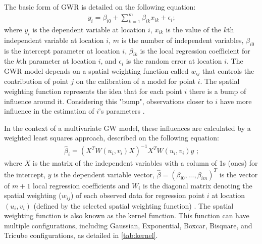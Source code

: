The basic form of GWR is detailed on the following equation:\begin{align}
    y_i = \beta_{i0} + \sum_{k=1}^{m} \beta_{ik} x_{ik} + \epsilon_i \mbox{;}
    \label{eq:gwr}
\end{align} where $y_i$ is the dependent variable at location $i$, $x_{ik}$ is the value of the $k$th independent variable at location $i$, $m$ is the number of independent variables, $\beta_{i0}$ is the intercept parameter at location $i$, $\beta_{ik}$ is the local regression coefficient for the $k$th parameter at location $i$, and $\epsilon_i$ is the random error at location $i$. The GWR model depends on a spatial weighting function called $w_{ij}$ that controls the contribution of point $j$ on the calibration of a model for point $i$. The spatial weighting function represents the idea that for each point $i$ there is a bump of influence around it. Considering this "bump", observations closer to $i$ have more influence in the estimation of $i$'s parameters \cite{Brunsdon2010,Gollini2013}.

In the context of a multivariate GW model, these influences are calculated by a weighted least squares approach, described on the following equation: \begin{align}
    \hat{\beta}_i = \left(X^TW\left(u_i,v_i\right)X\right)^{-1}X^TW\left(u_i, v_i \right)y\mbox{ ;}
    \label{eq:wls}
\end{align} where $X$ is the matrix of the independent variables with a column of 1s (ones) for the intercept, $y$ is the dependent variable vector, $\hat{\beta} = \left(\beta_{i0},...,\beta_{im}\right)^T$ is the vector of $m + 1$ local regression coefficients and $W_i$ is the diagonal matrix denoting the spatial weighting ($w_{ij}$) of each observed data for regression point $i$ at location $(u_i, v_i)$ (defined by the selected spatial weighting function) \cite{Gollini2013}. The spatial weighting function is also known as the kernel function. This function can have multiple configurations, including Gaussian, Exponential, Boxcar, Bisquare, and Tricube configurations, as detailed in \autoref{tab:kernel}.

